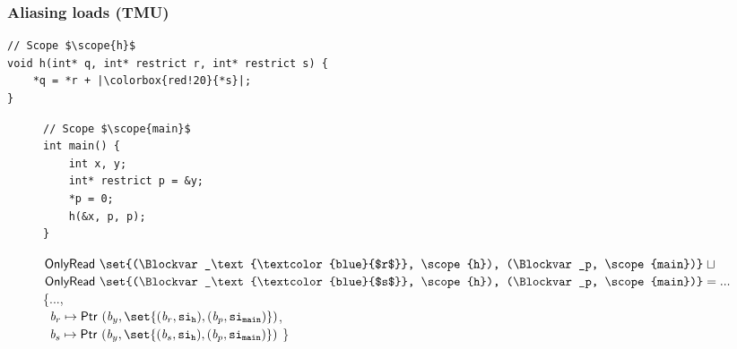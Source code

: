 \begin{frame}[fragile]
\frametitle{Aliasing loads (TMU)}
\begin{verbatim}
// Scope $\scope{h}$
void h(int* q, int* restrict r, int* restrict s) {
    *q = *r + |\colorbox{red!20}{*s}|; 
}
\end{verbatim}
\vspace*{-1cm}
\begin{figure}[!h]
\begin{minipage}[t]{.36\textwidth}

\begin{verbatim}
// Scope $\scope{main}$
int main() {
    int x, y;
    int* restrict p = &y;
    *p = 0;
    h(&x, p, p);
}
\end{verbatim}
\end{minipage}%
\begin{minipage}{.64\textwidth}
\colorbox{red!20}{$\onlyread{\set{(\Blockvar_\text{\textcolor{blue}{$r$}}, \scope{h}), (\Blockvar_p, \scope{main})}} \joinsym $} \\
\colorbox{red!20}{$\onlyread{\set{(\Blockvar_\text{\textcolor{blue}{$s$}}, \scope{h}), (\Blockvar_p, \scope{main})}} = ...$}
\\

\executionannotation
{
\{..., \\\  $\Blockvar_r \mapsto \ptr{(\Blockvar_y, \set{(\Blockvar_r, \scope{h}), (\Blockvar_p, \scope{main})})} $, \\
         \ $\Blockvar_s \mapsto \ptr{(\Blockvar_y, \set{(\Blockvar_s, \scope{h}), (\Blockvar_p, \scope{main})})}$ \}
}
{
}
\end{minipage}
\end{figure}

\end{frame}




